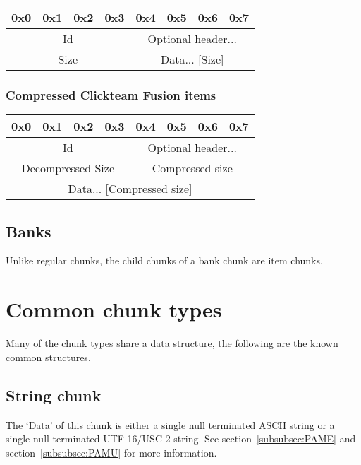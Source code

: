 \documentclass{article}
\begin{document}
\begin{tabular}{c|c|c|c|c|c|c|c}
  0x0 & 0x1 & 0x2 & 0x3 & 0x4 & 0x5 & 0x6 & 0x7
  \\ \hline
  \multicolumn{4}{|c|}{Id} &
  \multicolumn{4}{|c}{Optional header...}
  \\ \hline \hline
  \multicolumn{4}{|c|}{Size} &
  \multicolumn{4}{|c}{Data... [Size]}
  \\ \hline
\end{tabular}

\subsubsection[Compressed CTF items]{Compressed Clickteam Fusion items}

\begin{tabular}{c|c|c|c|c|c|c|c}
  0x0 & 0x1 & 0x2 & 0x3 & 0x4 & 0x5 & 0x6 & 0x7
  \\ \hline
  \multicolumn{4}{|c|}{Id} &
  \multicolumn{4}{|c}{Optional header...}
  \\ \hline \hline
  \multicolumn{4}{|c|}{Decompressed Size} &
  \multicolumn{4}{|c|}{Compressed size}
  \\ \hline
  \multicolumn{8}{|c}{Data... [Compressed size]}
  \\ \hline
\end{tabular}


\subsection{Banks}
\label{subsec:banks}

Unlike regular chunks, the child chunks of a bank chunk are item chunks.


\section[Common chunks]{Common chunk types}
\label{sec:common-chunks}

Many of the chunk types share a data structure, the following are the known
common structures.

\subsection[String chunk]{String chunk}
\label{subsec:string-chunk}

The `Data' of this chunk is either a single null terminated ASCII string or
a single null terminated UTF-16/USC-2 string.
See section~\ref{subsubsec:PAME} and section~\ref{subsubsec:PAMU} for more
information.
\end{document}

